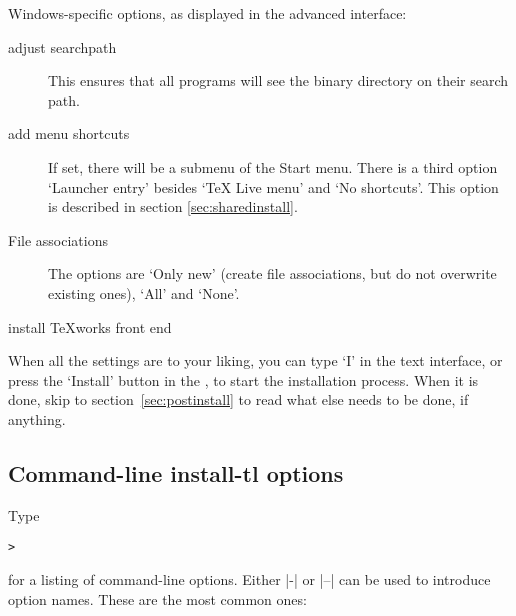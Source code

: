 \documentclass{article}
\begin{document}
Windows-specific options, as displayed in the advanced \GUI{}
interface:
\begin{description}
\item[adjust searchpath] This ensures that all
  programs will see the \TL{} binary directory on their search path.

\item[add menu shortcuts] If set, there will be a \TL{} submenu of
  the Start menu. There is a third option `Launcher entry' besides
  `TeX Live menu' and `No shortcuts'. This option is described in
  section \ref{sec:sharedinstall}.

\item[File associations] The options are `Only new' (create
  file associations, but do not overwrite existing ones), `All' and
  `None'.

\item[install \TeX{}works front end]
\end{description}
When all the settings are to your liking, you can type `I' in the
text interface, or press the `Install' button in the
\GUI, to start the installation process. When it is done,
skip to section~\ref{sec:postinstall} to read what else needs to be
done, if anything.

\subsection{Command-line install-tl options}
\label{sec:cmdline}

Type
\begin{alltt}
> 
\end{alltt}
for a listing of command-line options.  Either |-| or |--| can be used
to introduce option names.  These are the most common ones:
\end{document}
